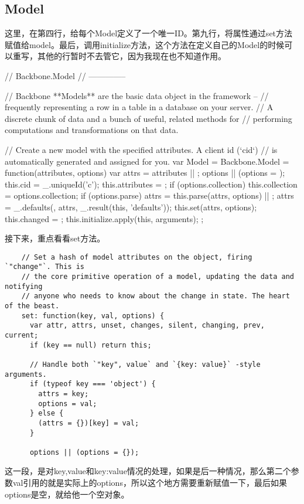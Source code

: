 \subsection{Model}
  这里，在第四行，给每个Model定义了一个唯一ID。第九行，将属性通过set方法赋值给model。最后，调用initialize方法，这个方法在定义自己的Model的时候可以重写，其他的行暂时不去管它，因为我现在也不知道作用。
\begin{JavaScript}
  // Backbone.Model
  // --------------

  // Backbone **Models** are the basic data object in the framework --
  // frequently representing a row in a table in a database on your server.
  // A discrete chunk of data and a bunch of useful, related methods for
  // performing computations and transformations on that data.

  // Create a new model with the specified attributes. A client id (`cid`)
  // is automatically generated and assigned for you.
  var Model = Backbone.Model = function(attributes, options) {
    var attrs = attributes || {};
    options || (options = {});
    this.cid = _.uniqueId('c');
    this.attributes = {};
    if (options.collection) this.collection = options.collection;
    if (options.parse) attrs = this.parse(attrs, options) || {};
    attrs = _.defaults({}, attrs, _.result(this, 'defaults'));
    this.set(attrs, options);
    this.changed = {};
    this.initialize.apply(this, arguments);
  };
\end{JavaScript}

  接下来，重点看看set方法。
  \begin{lstlisting}
    // Set a hash of model attributes on the object, firing `"change"`. This is
    // the core primitive operation of a model, updating the data and notifying
    // anyone who needs to know about the change in state. The heart of the beast.
    set: function(key, val, options) {
      var attr, attrs, unset, changes, silent, changing, prev, current;
      if (key == null) return this;

      // Handle both `"key", value` and `{key: value}` -style arguments.
      if (typeof key === 'object') {
        attrs = key;
        options = val;
      } else {
        (attrs = {})[key] = val;
      }

      options || (options = {});
  \end{lstlisting}
  这一段，是对key,value和{key:value}情况的处理，如果是后一种情况，那么第二个参数val引用的就是实际上的options，所以这个地方需要重新赋值一下，最后如果options是空，就给他一个空对象。

